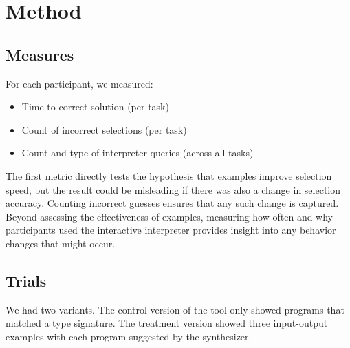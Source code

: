 \section{Method}




\subsection{Measures}
For each participant, we measured:
\begin{itemize}
    \item Time-to-correct solution (per task)
    \item Count of incorrect selections (per task)
    \item Count and type of interpreter queries (across all tasks)
\end{itemize}

The first metric directly tests the hypothesis that examples improve
selection speed, but the result could be misleading if there was also a
change in selection accuracy.
%
Counting incorrect guesses ensures that any such change is captured.
%
Beyond assessing the effectiveness of examples, measuring how often and why
participants used the interactive interpreter provides insight into any
behavior changes that might occur.

\subsection{Trials}
We had two variants.
%
The control version of the tool only showed programs that matched a type signature.
%
The treatment version showed three input-output examples with each program
suggested by the synthesizer.

